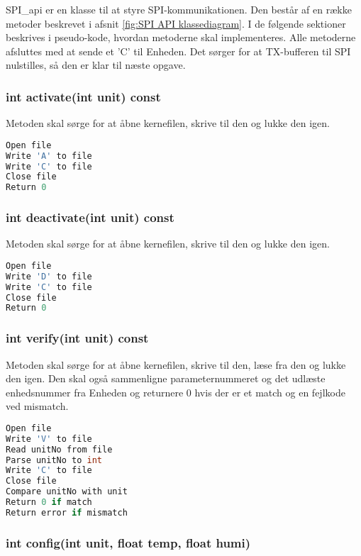 
SPI\_api er en klasse til at styre SPI-kommunikationen. Den består af en række metoder beskrevet i afsnit \ref{fig:SPI API klassediagram}. I de følgende sektioner beskrives i pseudo-kode, hvordan metoderne skal implementeres. Alle metoderne afsluttes med at sende et 'C' til Enheden. Det sørger for at TX-bufferen til SPI nulstilles, så den er klar til næste opgave.

\subsubsection*{int activate(int unit) const}

Metoden skal sørge for at åbne kernefilen, skrive til den og lukke den igen.

\begin{lstlisting}[language=C]
Open file
Write 'A' to file
Write 'C' to file
Close file
Return 0
\end{lstlisting} 
\subsubsection*{int deactivate(int unit) const}

Metoden skal sørge for at åbne kernefilen, skrive til den og lukke den igen.

\begin{lstlisting}[language=C]
Open file
Write 'D' to file
Write 'C' to file
Close file
Return 0
\end{lstlisting} 
\subsubsection*{int verify(int unit) const} 

Metoden skal sørge for at åbne kernefilen, skrive til den, læse fra den og lukke den igen.
Den skal også sammenligne parameternummeret og det udlæste enhedsnummer fra Enheden og returnere 0 hvis der er et match og en fejlkode ved mismatch.

\begin{lstlisting}[language=C]
Open file
Write 'V' to file
Read unitNo from file
Parse unitNo to int
Write 'C' to file
Close file
Compare unitNo with unit
Return 0 if match
Return error if mismatch
\end{lstlisting} 
\subsubsection*{int config(int unit, float temp, float humi)} 

